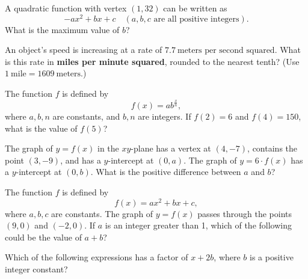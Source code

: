 A quadratic function with vertex \((1, 32)\) can be written as
\[
 -ax^2 + bx + c \quad (a, b, c \text{ are all positive integers}).
\]
What is the maximum value of \(b\)?

\vspace{2em}

\noindent\markforreview
\vspace{1em}

An object's speed is increasing at a rate of \(7.7\ \text{meters per second squared}\). What is this rate in \textbf{miles per minute squared}, rounded to the nearest tenth? (Use \(1\ \text{mile} = 1609\ \text{meters}\).)

\vspace{0.75em}


\vspace{2em}

\noindent\markforreview
\vspace{1em}

The function \(f\) is defined by
\[
f(x) = ab^{\frac{x}{n}},
\]
where \(a, b, n\) are constants, and \(b, n\) are integers. If \(f(2) = 6\) and \(f(4) = 150\), what is the value of \(f(5)\)?

\vspace{3em}

\noindent\markforreview
\vspace{1em}

The graph of \(y = f(x)\) in the \(xy\)-plane has a vertex at \((4, -7)\), contains the point \((3, -9)\), and has a \(y\)-intercept at \((0, a)\). The graph of \(y = 6 \cdot f(x)\) has a \(y\)-intercept at \((0, b)\). What is the positive difference between \(a\) and \(b\)?

\vspace{2em}

\noindent\markforreview
\vspace{1em}

The function \(f\) is defined by
\[
f(x) = ax^2 + bx + c,
\]
where \(a, b, c\) are constants. The graph of \(y = f(x)\) passes through the points \((9, 0)\) and \((-2, 0)\). If \(a\) is an integer greater than 1, which of the following could be the value of \(a + b\)?

\vspace{0.75em}


\vspace{2em}

\newpage
\noindent\markforreview
\vspace{1em}

Which of the following expressions has a factor of \(x + 2b\), where \(b\) is a positive integer constant?

